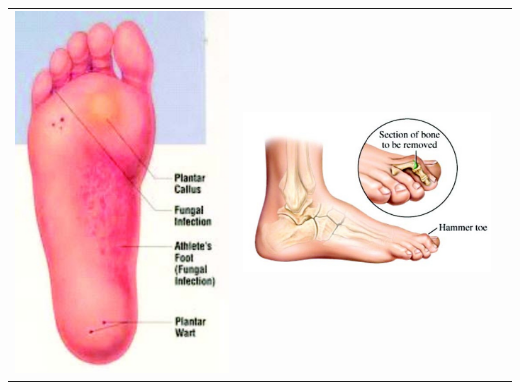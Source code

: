\begin{center}
\begin{tabular}{@{}ccc@{}}
\includegraphics[scale=.7]{images/060.jpg} &
\includegraphics[scale=.8]{images/061.jpg} &

\end{tabular}
\end{center}
